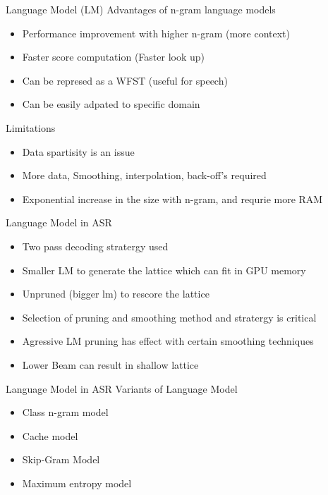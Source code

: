 \documentclass{beamer}
\begin{document}
\begin{frame}{Language Model (LM)}
	Advantages of n-gram language models

	\begin{itemize}
		\item Performance improvement with higher n-gram (more context)
		\item Faster score computation (Faster look up)
		\item Can be represed as a WFST (useful for speech) 
		\item Can be easily adpated to specific domain
	\end{itemize}

	Limitations

	\begin{itemize}
		\item Data spartisity is an issue
		\item More data, Smoothing, interpolation, back-off's required
		\item Exponential increase in the size with n-gram, and requrie more RAM
	\end{itemize}

\end{frame}


\begin{frame}{Language Model in ASR}
	\begin{itemize}
		\item Two pass decoding stratergy used
		\item Smaller LM to generate the lattice which can fit in GPU memory
		\item Unpruned (bigger lm) to rescore the lattice
		\item Selection of pruning and smoothing method and stratergy is critical
		\item Agressive LM pruning has effect with certain smoothing techniques
		\item Lower Beam can result in shallow lattice
	\end{itemize}
\end{frame}


\begin{frame}{Language Model in ASR}
	Variants of Language Model

	\begin{itemize}
		\item Class n-gram model
		\item Cache model
		\item Skip-Gram Model
		\item Maximum entropy model
	\end{itemize}	
\end{frame}
\end{document}

